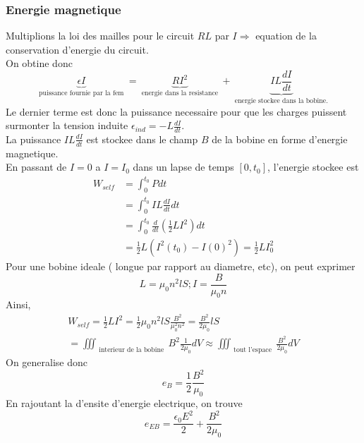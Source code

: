 \documentclass[../main.tex]{subfiles}
\begin{document}
\subsubsection{Energie magnetique}
Multiplions la loi des mailles pour le circuit $RL$ par $I \Rightarrow $ equation de la conservation d'energie du circuit.\\
On obtine donc
\[ 
\underbrace{\epsilon I}_{ \text{ puissance fournie par la fem } } = \underbrace{RI^{2}}_{ \text{ energie dans la resistance } } + \underbrace{IL \frac{dI}{dt}}_{ \text{ energie stockee dans la bobine. } }
\]
Le dernier terme est donc la puissance necessaire pour que les charges puissent surmonter la tension induite $\epsilon_{ind} = - L \frac{dI}{dt}$.\\
La puissance $IL \frac{dI}{dt}$ est stockee dans le champ $B$ de la bobine en forme d'energie magnetique.\\
En passant de $I=0$ a $I= I_0$ dans un lapse de temps $[0, t_0]$, l'energie stockee est
\begin{align*}
	W_{self } &= \int_{ 0 }^{ t_0 }P dt \\
		  &= \int_{ 0 }^{ t_0 }I L \frac{dI}{dt}dt\\
		  &= \int_{ 0 }^{ t_0 }\frac{d}{dt}( \frac{1}{2}L I^{2}) dt\\
		  &= \frac{1}{2} L ( I^{2}( t_0) - I( 0)^{2} )  = \frac{1}{2}L I_0^{2}
\end{align*}
Pour une bobine ideale ( longue par rapport au diametre, etc), on peut exprimer
\[ 
L= \mu_0 n^{2} l S; I = \frac{B}{\mu_0 n}
\]
Ainsi,
\begin{align*}
W_{self}  = \frac{1}{2}L I^{2} = \frac{1}{2}\mu_0 n^{2}l S \frac{B^{2}}{\mu_0^{2}n^{2}} = \frac{B^{2}}{ 2 \mu_0} l S\\
= \iiint_{ \text{ interieur de la bobine } } B^{2} \frac{1}{2\mu_0}dV \approx \iiint_{ \text{ tout l'espace } } \frac{B^{2}}{2\mu_0}dV
\end{align*}
On generalise donc
\[ 
e_B = \frac{1}{2}\frac{B^{2}}{\mu_0}
\]
En rajoutant la d'ensite d'energie electrique, on trouve
\[ 
e_{EB} = \frac{\epsilon_0 E^{2}}{2} + \frac{B^{2}}{2 \mu_0}
\]
	
\end{document}
